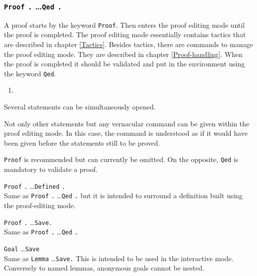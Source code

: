 \subsubsection{{\tt Proof} {\tt .} \dots {\tt Qed} {\tt .}}

A proof starts by the keyword {\tt Proof}.  Then {\Coq} enters the
proof editing mode until the proof is completed. The proof editing
mode essentially contains tactics that are described in chapter
\ref{Tactics}. Besides tactics, there are commands to manage the proof
editing mode. They are described in chapter \ref{Proof-handling}. When
the proof is completed it should be validated and put in the
environment using the keyword {\tt Qed}.
\medskip

\ErrMsg
\begin{enumerate}
\item {}
\end{enumerate}

\begin{Remarks}
\item Several statements can be simultaneously opened.
\item Not only other statements but any vernacular command can be given
within the proof editing mode. In this case, the command is
understood as if it would have been given before the statements still to be
proved. 
\item {\tt Proof} is recommended but can currently be omitted. On the
opposite, {\tt Qed} is mandatory to validate a proof.
\end{Remarks}

\begin{Variants}
\item {\tt Proof} {\tt .} \dots {\tt Defined} {\tt .}\\
  Same as {\tt Proof} {\tt .} \dots {\tt Qed} {\tt .} but it is
  intended to surround a definition built using the proof-editing mode.
\item {\tt Proof} {\tt .} \dots {\tt Save.}\\
  Same as {\tt Proof} {\tt .} \dots {\tt Qed} {\tt .}
\item {\tt Goal} \type \dots {\tt Save} \ident \\
  Same as {\tt Lemma} \ident {\tt :} \type \dots {\tt Save.}
  This is intended to be used in the interactive mode. Conversely to named
  lemmas, anonymous goals cannot be nested.
\end{Variants}


